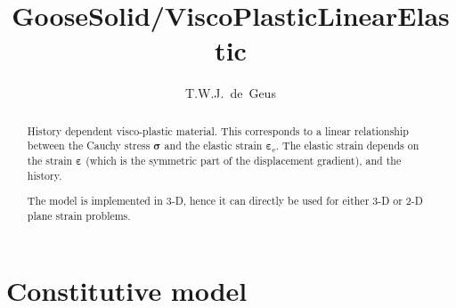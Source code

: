 \documentclass[times,namecite]{goose-article}
\title{%
  GooseSolid/ViscoPlasticLinearElastic
}
\author{T.W.J.~de~Geus}
\begin{document}
\maketitle

\begin{abstract}
History dependent visco-plastic material. This corresponds to a linear relationship between the Cauchy stress $\bm{\sigma}$ and the elastic strain $\bm{\varepsilon}_\mathrm{e}$. The elastic strain depends on the strain $\bm{\varepsilon}$ (which is the symmetric part of the displacement gradient), and the history.

The model is implemented in 3-D, hence it can directly be used for either 3-D or 2-D plane strain problems.
\end{abstract}


\setcounter{tocdepth}{2}
\tableofcontents

\vfill\newpage
\section{Constitutive model}
\end{document}
